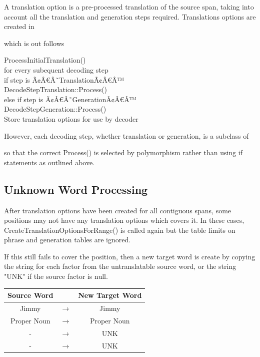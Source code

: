 \documentclass[11pt]{report}
\theoremstyle{plain}
\begin{document}
{A translation option is a pre-processed translation of the source span, taking into account all the translation and generation steps required. Translations options are created in\\

which is out follows\\
\begin{tt}
\indent	ProcessInitialTranslation()\\
\indent	for every subequent decoding step\\
\indent \indent	if step is Ã¢Â€Â˜TranslationÃ¢Â€Â™\\
\indent \indent \indent	DecodeStepTranslation::Process()\\
\indent \indent else if step is Ã¢Â€Â˜GenerationÃ¢Â€Â™\\
\indent \indent \indent DecodeStepGeneration::Process()\\
\indent Store translation options for use by decoder\\
\end{tt}

However, each decoding step, whether translation or generation, is a subclass of\\

so that the correct Process() is selected by polymorphism rather than using if statements as outlined above.


\subsection{Unknown Word Processing}
After translation options have been created for all contiguous spans, some positions may not have any translation options which covers it. In these cases, CreateTranslationOptionsForRange() is called again but the table limits on phrase and generation tables are ignored.

If this still fails to cover the position, then a new target word is create by copying the string for each factor from the untranslatable source word, or the string "UNK" if the source factor is null.

\begin{center}
\begin{tabular}{|c|c|c|}
\hline
Source Word & & New Target Word \\ \hline
Jimmy	& 	$\to$	& Jimmy\\
Proper Noun	& $\to$	& Proper Noun\\
-	& $\to$	& UNK\\
-	& $\to$	& UNK\\ \hline
\end{tabular}
\end{center}

}
\end{document}
